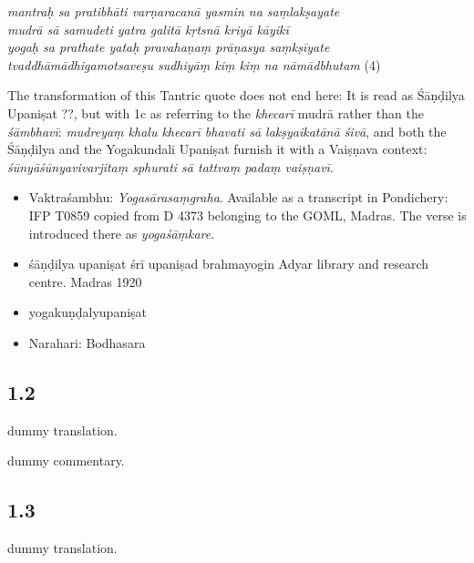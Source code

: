 \begin{ekdosis}
\begin{philcomm}[hp01_001]
    \begin{ekdverse}
      \emph{mantraḥ sa pratibhāti varṇaracanā yasmin na saṃlakṣayate}\\
      \emph{mudrā sā samudeti yatra galitā kṛtsnā kriyā kāyikī}\\
      \emph{yogaḥ sa prathate yataḥ pravahaṇaṃ prāṇasya saṃkṣīyate}\\
      \emph{tvaddhāmādhigamotsaveṣu sudhiyāṃ kiṃ kiṃ na nāmādbhutam} (4)\\
    \end{ekdverse}

    \noindent
    The transformation of this Tantric quote does not end here: It is read as Śāṇḍilya Upaniṣat ??, but
    with 1c as referring to the \emph{khecarī} mudrā rather than the \emph{śāmbhavī}: \emph{mudreyaṃ
      khalu khecarī bhavati sā lakṣyaikatānā śivā}, and both the Śāṇḍilya and the Yogakundali Upaniṣat
    furnish it with a Vaiṣṇava context: \emph{śūnyāśūnyavivarjitaṃ sphurati sā tattvaṃ padaṃ vaiṣṇavī}.

    \begin{itemize}
      \item{Vaktraśambhu: \emph{Yogasārasaṃgraha}. Available as a transcript in Pondichery: IFP T0859 copied from D 4373 belonging to the GOML, Madras. The verse is introduced there as \emph{yogaśāṃkare}.}
      \item{śāṇḍilya upaniṣat śrī upaniṣad brahmayogin Adyar library and research centre. Madras 1920}
      \item{yogakuṇḍalyupaniṣat}
      \item{Narahari: Bodhasara}
    \end{itemize}
  \end{philcomm}


  \subsection*{1.2}
  \begin{translation}[hp01_002]
    dummy translation.
  \end{translation}

  \begin{philcomm}[hp01_002]
    dummy commentary.
  \end{philcomm}


  \subsection*{1.3}
  \begin{translation}[hp01_003]
    dummy translation.
  \end{translation}
  

\end{ekdosis}
